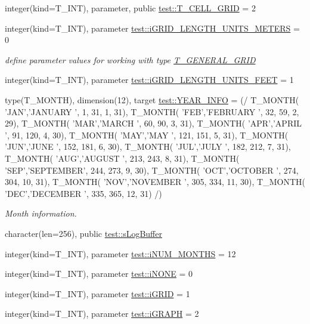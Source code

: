 \begin{DoxyCompactItemize}
\item 
integer(kind=T\_\-INT), parameter, public \hyperlink{namespacetest_afdd43703b42a2585fd3e53240e541b80}{test::T\_\-CELL\_\-GRID} = 2
\item 
integer(kind=T\_\-INT), parameter \hyperlink{namespacetest_a136c3b9231683ffea8eae2e7920d956d}{test::iGRID\_\-LENGTH\_\-UNITS\_\-METERS} = 0
\begin{DoxyCompactList}\small\item\em define parameter values for working with type \hyperlink{typetest_1_1_t___g_e_n_e_r_a_l___g_r_i_d}{T\_\-GENERAL\_\-GRID} \item\end{DoxyCompactList}\item 
integer(kind=T\_\-INT), parameter \hyperlink{namespacetest_ac5e6e1cd934b6a95f6d38d6a1e1f6bac}{test::iGRID\_\-LENGTH\_\-UNITS\_\-FEET} = 1
\item 
type(T\_\-MONTH), dimension(12), target \hyperlink{namespacetest_a0cc123ab400cd2007652453350776116}{test::YEAR\_\-INFO} = (/ T\_\-MONTH( 'JAN','JANUARY ', 1, 31, 1, 31), T\_\-MONTH( 'FEB','FEBRUARY ', 32, 59, 2, 29), T\_\-MONTH( 'MAR','MARCH ', 60, 90, 3, 31), T\_\-MONTH( 'APR','APRIL ', 91, 120, 4, 30), T\_\-MONTH( 'MAY','MAY ', 121, 151, 5, 31), T\_\-MONTH( 'JUN','JUNE ', 152, 181, 6, 30), T\_\-MONTH( 'JUL','JULY ', 182, 212, 7, 31), T\_\-MONTH( 'AUG','AUGUST ', 213, 243, 8, 31), T\_\-MONTH( 'SEP','SEPTEMBER', 244, 273, 9, 30), T\_\-MONTH( 'OCT','OCTOBER ', 274, 304, 10, 31), T\_\-MONTH( 'NOV','NOVEMBER ', 305, 334, 11, 30), T\_\-MONTH( 'DEC','DECEMBER ', 335, 365, 12, 31) /)
\begin{DoxyCompactList}\small\item\em Month information. \item\end{DoxyCompactList}\item 
character(len=256), public \hyperlink{namespacetest_afa1c66465bae9135884cfa7867b9df30}{test::sLogBuffer}
\item 
integer(kind=T\_\-INT), parameter \hyperlink{namespacetest_af0399520b5b36576c3c4e8305b487c65}{test::iNUM\_\-MONTHS} = 12
\item 
integer(kind=T\_\-INT), parameter \hyperlink{namespacetest_a1f50531cf0fa6afcb5cea12a45a90947}{test::iNONE} = 0
\item 
integer(kind=T\_\-INT), parameter \hyperlink{namespacetest_ab7d5ec03d44589c79aea69862eda7b7a}{test::iGRID} = 1
\item 
integer(kind=T\_\-INT), parameter \hyperlink{namespacetest_abc7de6feee74a86b9aa08b5951e94d08}{test::iGRAPH} = 2

\end{DoxyCompactItemize}
